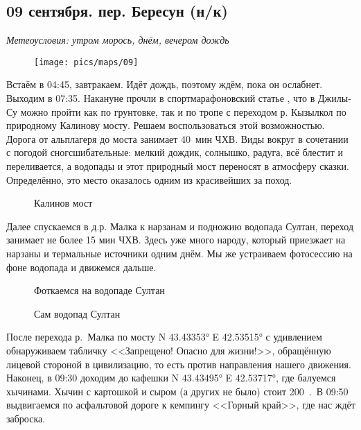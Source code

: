 \subsection{09 сентября. пер. Бересун (н/к)}
\textit{Метеоусловия: утром морось, днём, вечером дождь}

\begin{figure}[h!]
	\centering
	\texttt{[image: pics/maps/09]}
	\label{fig:09}
\end{figure}

Встаём в 04:45, завтракаем. Идёт дождь, поэтому ждём, пока он ослабнет. Выходим в 07:35. Накануне прочли в спортмарафоновский статье \cite{dzhilysu}, что в Джилы-Су можно пройти как по грунтовке, так и по тропе с переходом р. Кызылкол по природному Калинову мосту. Решаем воспользоваться этой возможностью. Дорога от альплагеря до моста занимает 40~мин ЧХВ. Виды вокруг в сочетании с погодой сногсшибательные: мелкий дождик, солнышко, радуга, всё блестит и переливается, а водопады и этот природный мост переносят в атмосферу сказки. Определённо, это место оказалось одним из красивейших за поход.

\begin{figure}[h!]
	\centering
	\caption{Калинов мост}
	\label{fig:kalinov}
\end{figure}

Далее спускаемся в д.р. Малка к нарзанам и подножию водопада Султан, переход занимает не более 15 мин ЧХВ. Здесь уже много народу, который приезжает на нарзаны и термальные источники одним днём. Мы же устраиваем фотосессию на фоне водопада и движемся дальше. 

\begin{figure}[h!]
	\centering
	\caption{Фоткаемся на водопаде Султан}
	\label{fig:sultan}
\end{figure}

\begin{figure}[h!]
	\centering
	\caption{Сам водопад Султан}
	\label{fig:sultan1}
\end{figure}

После перехода р.~Малка по мосту N 43.43353° E 42.53515° с удивлением обнаруживаем табличку <<Запрещено! Опасно для жизни!>>, обращённую лицевой стороной в цивилизацию, то есть против направления нашего движения. Наконец, в 09:30 доходим до кафешки N 43.43495° E 42.53717°, где балуемся хычинами. Хычин с картошкой и сыром (а других не было) стоит 200~\faRub.~В 09:50 выдвигаемся по асфальтовой дороге к кемпингу <<Горный край>>, где нас ждёт заброска.

